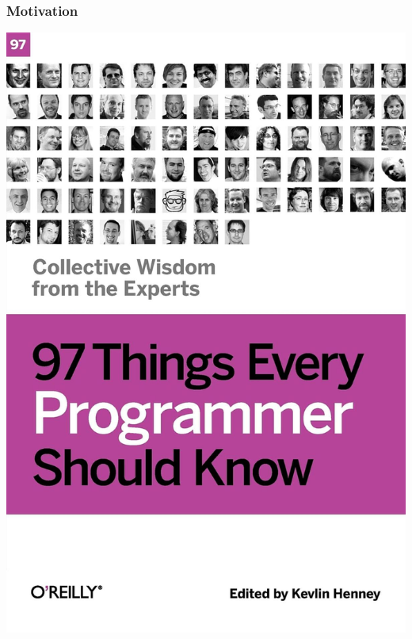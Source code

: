 \documentclass[aspectratio=169]{beamer}
\begin{document}
\begin{frame}
  \frametitle{Motivation}
  
  \begin{center}
  \includegraphics[height=.9\textheight]{resources/kevlin_97_things.jpg}
  \end{center}

\end{frame}
\end{document}
